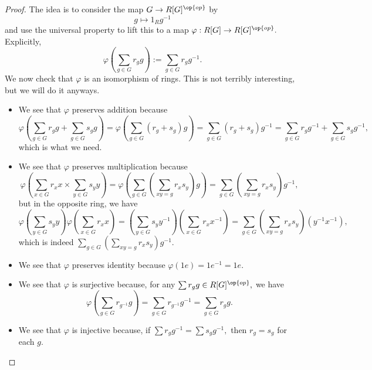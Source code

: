 \documentclass[../notes.tex]{subfiles}
\begin{document}
\begin{proof}
	The idea is to consider the map $G\to R[G]^{\op{op}}$ by
	\[g\mapsto1_Rg^{-1}\]
	and use the universal property to lift this to a map $\varphi:R[G]\to R[G]^{\op{op}}.$ Explicitly,
	\[\varphi\left(\sum_{g\in G}r_gg\right):=\sum_{g\in G}r_gg^{-1}.\]
	We now check that $\varphi$ is an isomorphism of rings. This is not terribly interesting, but we will do it anyways.
	\begin{itemize}
		\item We see that $\varphi$ preserves addition because
		\[\varphi\left(\sum_{g\in G}r_gg+\sum_{g\in G}s_gg\right)=\varphi\left(\sum_{g\in G}(r_g+s_g)g\right)=\sum_{g\in G}(r_g+s_g)g^{-1}=\sum_{g\in G}r_gg^{-1}+\sum_{g\in G}s_gg^{-1},\]
		which is what we need.
		\item We see that $\varphi$ preserves multiplication because
		\[\varphi\left(\sum_{x\in G}r_xx\times\sum_{y\in G}s_yy\right)=\varphi\left(\sum_{g\in G}\left(\sum_{xy=g}r_xs_y\right)g\right)=\sum_{g\in G}\left(\sum_{xy=g}r_xs_y\right)g^{-1},\]
		but in the opposite ring, we have
		\[\varphi\left(\sum_{y\in G}s_yy\right)\varphi\left(\sum_{x\in G}r_xx\right)=\left(\sum_{y\in G}s_yy^{-1}\right)\left(\sum_{x\in G}r_xx^{-1}\right)=\sum_{g\in G}\left(\sum_{xy=g}r_xs_y\right)\left(y^{-1}x^{-1}\right),\]
		which is indeed $\sum_{g\in G}\left(\sum_{xy=g}r_xs_y\right)g^{-1}.$
		\item We see that $\varphi$ preserves identity because $\varphi(1e)=1e^{-1}=1e.$
		\item We see that $\varphi$ is surjective because, for any $\sum r_gg\in R[G]^{\op{op}},$ we have
		\[\varphi\left(\sum_{g\in G}r_{g^{-1}}g\right)=\sum_{g\in G}r_{g^{-1}}g^{-1}=\sum_{g\in G}r_gg.\]
		\item We see that $\varphi$ is injective because, if $\sum r_gg^{-1}=\sum s_gg^{-1},$ then $r_g=s_g$ for each $g.$
		\qedhere
	\end{itemize}
\end{proof}
\end{document}

